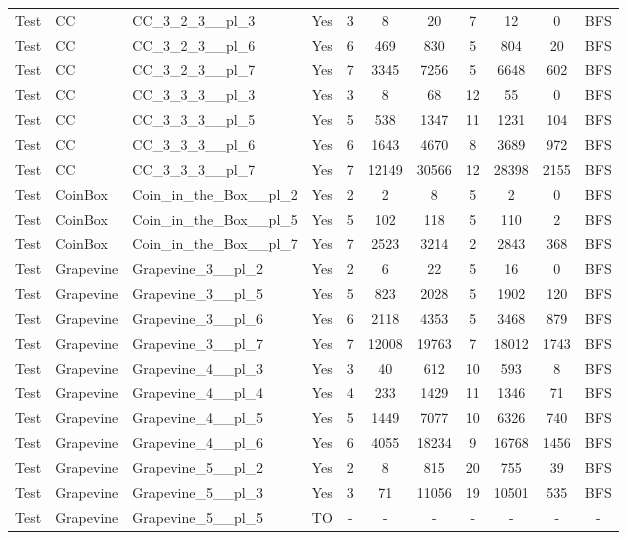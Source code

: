 \documentclass{article}
\begin{document}
\begin{tabular}{lllcccccccc}
Test & CC & CC\_3\_2\_3\_\_pl\_3 & Yes & 3 & 8 & 20 & 7 & 12 & 0 & BFS \\
Test & CC & CC\_3\_2\_3\_\_pl\_6 & Yes & 6 & 469 & 830 & 5 & 804 & 20 & BFS \\
Test & CC & CC\_3\_2\_3\_\_pl\_7 & Yes & 7 & 3345 & 7256 & 5 & 6648 & 602 & BFS \\
Test & CC & CC\_3\_3\_3\_\_pl\_3 & Yes & 3 & 8 & 68 & 12 & 55 & 0 & BFS \\
Test & CC & CC\_3\_3\_3\_\_pl\_5 & Yes & 5 & 538 & 1347 & 11 & 1231 & 104 & BFS \\
Test & CC & CC\_3\_3\_3\_\_pl\_6 & Yes & 6 & 1643 & 4670 & 8 & 3689 & 972 & BFS \\
Test & CC & CC\_3\_3\_3\_\_pl\_7 & Yes & 7 & 12149 & 30566 & 12 & 28398 & 2155 & BFS \\
Test & CoinBox & Coin\_in\_the\_Box\_\_pl\_2 & Yes & 2 & 2 & 8 & 5 & 2 & 0 & BFS \\
Test & CoinBox & Coin\_in\_the\_Box\_\_pl\_5 & Yes & 5 & 102 & 118 & 5 & 110 & 2 & BFS \\
Test & CoinBox & Coin\_in\_the\_Box\_\_pl\_7 & Yes & 7 & 2523 & 3214 & 2 & 2843 & 368 & BFS \\
Test & Grapevine & Grapevine\_3\_\_pl\_2 & Yes & 2 & 6 & 22 & 5 & 16 & 0 & BFS \\
Test & Grapevine & Grapevine\_3\_\_pl\_5 & Yes & 5 & 823 & 2028 & 5 & 1902 & 120 & BFS \\
Test & Grapevine & Grapevine\_3\_\_pl\_6 & Yes & 6 & 2118 & 4353 & 5 & 3468 & 879 & BFS \\
Test & Grapevine & Grapevine\_3\_\_pl\_7 & Yes & 7 & 12008 & 19763 & 7 & 18012 & 1743 & BFS \\
Test & Grapevine & Grapevine\_4\_\_pl\_3 & Yes & 3 & 40 & 612 & 10 & 593 & 8 & BFS \\
Test & Grapevine & Grapevine\_4\_\_pl\_4 & Yes & 4 & 233 & 1429 & 11 & 1346 & 71 & BFS \\
Test & Grapevine & Grapevine\_4\_\_pl\_5 & Yes & 5 & 1449 & 7077 & 10 & 6326 & 740 & BFS \\
Test & Grapevine & Grapevine\_4\_\_pl\_6 & Yes & 6 & 4055 & 18234 & 9 & 16768 & 1456 & BFS \\
Test & Grapevine & Grapevine\_5\_\_pl\_2 & Yes & 2 & 8 & 815 & 20 & 755 & 39 & BFS \\
Test & Grapevine & Grapevine\_5\_\_pl\_3 & Yes & 3 & 71 & 11056 & 19 & 10501 & 535 & BFS \\
Test & Grapevine & Grapevine\_5\_\_pl\_5 & TO & - & - & - & - & - & - & - \\

\end{tabular}
\end{document}
